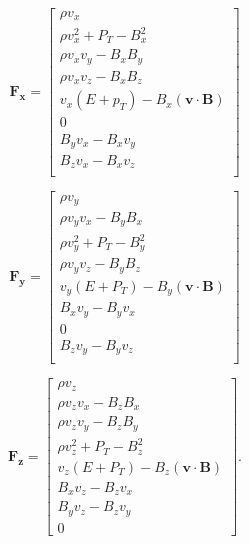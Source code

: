 \documentclass[modern]{aastex631}
\begin{document}
\begin{equation}
    \boldsymbol{F_x} = \begin{bmatrix}
            \rho v_{x} \\
            \rho v_{x}^2 + P_{T} - B_{x}^2 \\
            \rho v_{x} v_{y} - B_{x} B_{y} \\
            \rho v_{x} v_{z} - B_{x} B_{z} \\
            v_{x} \left( E + p_{T} \right) - B_{x} \left( \boldsymbol{v} \cdot \boldsymbol{B} \right) \\
            0 \\
            B_{y} v_{x} - B_{x} v_{y} \\
            B_{z} v_{x} - B_{x} v_{z} \\
         \end{bmatrix}
\end{equation}

\begin{equation}
    \boldsymbol{F_y} = \begin{bmatrix}
            \rho v_{y} \\
            \rho v_{y} v_{x} - B_{y} B_{x} \\
            \rho v_{y}^2 + P_{T} - B_{y}^2 \\
            \rho v_{y} v_{z} - B_{y} B_{z} \\
            v_{y} \left( E + P_{T} \right) - B_{y} \left( \boldsymbol{v} \cdot \boldsymbol{B} \right) \\
            B_{x} v_{y} - B_{y} v_{x} \\
            0 \\
            B_{z} v_{y} - B_{y} v_{z} \\
         \end{bmatrix}
\end{equation}

\begin{equation}
    \boldsymbol{F_z} = \begin{bmatrix}
            \rho v_{z} \\
            \rho v_{z} v_{x} - B_{z} B_{x} \\
            \rho v_{z} v_{y} - B_{z} B_{y} \\
            \rho v_{z}^2 + P_{T} - B_{z}^2 \\
            v_{z} \left( E + P_{T} \right) - B_{z} \left( \boldsymbol{v} \cdot \boldsymbol{B} \right) \\
            B_{x} v_{z} - B_{z} v_{x} \\
            B_{y} v_{z} - B_{z} v_{y} \\
            0
         \end{bmatrix}.
\end{equation}
\end{document}
